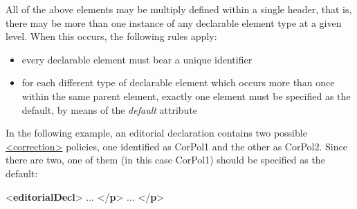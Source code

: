  All of the above elements may be multiply defined within a single header, that is, there may be more than one instance of any declarable element type at a given level. When this occurs, the following rules apply: \begin{itemize}
\item every declarable element must bear a unique identifier
\item for each different type of declarable element which occurs more than once within the same parent element, exactly one element must be specified as the default, by means of the {\itshape default} attribute
\end{itemize} \par
In the following example, an editorial declaration contains two possible \hyperref[TEI.correction]{<correction>} policies, one identified as CorPol1 and the other as CorPol2. Since there are two, one of them (in this case CorPol1) should be specified as the default: \par\bgroup{}\exampleFont \begin{shaded}\noindent\mbox{}{<\textbf{editorialDecl}>}\mbox{}\newline 
{}\mbox{}\newline 
\hspace*{1em} ... {</\textbf{p}>}\mbox{}\newline 
{}\mbox{}\newline 
{}\mbox{}\newline 
\hspace*{1em} ... {</\textbf{p}>}\mbox{}\newline 

\end{shaded}
